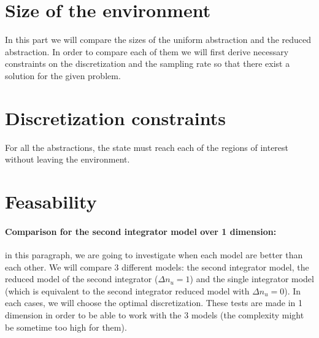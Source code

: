 \section{Size of the environment}
%
%	
%
In this part we will compare the sizes of the uniform abstraction and the reduced abstraction.
In order to compare each of them we will first derive necessary constraints on the discretization and the sampling rate so that there exist a solution for the given problem.

\section{Discretization constraints}
For all the abstractions, the state must reach each of the regions of interest without leaving the environment.

\section{Feasability}
\paragraph{Comparison for the second integrator model over 1 dimension:} in this paragraph, we are going to investigate when each model are better than each other.
We will compare 3 different models:
the second integrator model,
the reduced model of the second integrator ($\Delta n_u = 1$)
and the single integrator model (which is equivalent to the second integrator reduced model with $\Delta n_u = 0$).
In each cases, we will choose the optimal discretization. These tests are made in 1 dimension in order to be able to work with the 3 models (the complexity might be sometime too high for them).


